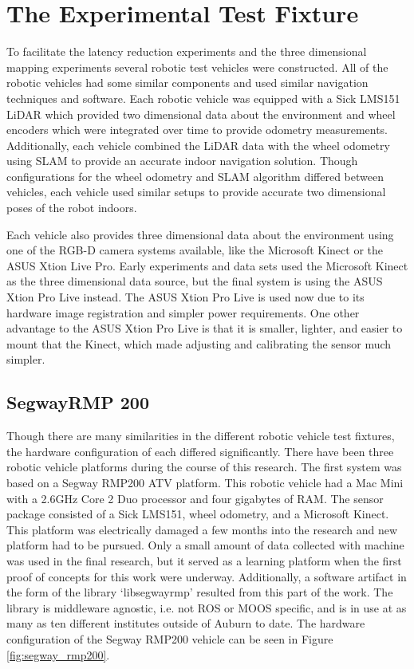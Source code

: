 \documentclass[12pt]{report}
\begin{document}
\section{The Experimental Test Fixture}\label{sec:robotic_vehicle}
To facilitate the latency reduction experiments and the three dimensional mapping experiments several robotic test vehicles were constructed.  All of the robotic vehicles had some similar components and used similar navigation techniques and software.  Each robotic vehicle was equipped with a Sick LMS151 LiDAR which provided two dimensional data about the environment and wheel encoders which were integrated over time to provide odometry measurements.  Additionally, each vehicle combined the LiDAR data with the wheel odometry using SLAM to provide an accurate indoor navigation solution.  Though configurations for the wheel odometry and SLAM algorithm differed between vehicles, each vehicle used similar setups to provide accurate two dimensional poses of the robot indoors.

Each vehicle also provides three dimensional data about the environment using one of the RGB-D camera systems available, like the Microsoft Kinect or the ASUS Xtion Live Pro.  Early experiments and data sets used the Microsoft Kinect as the three dimensional data source, but the final system is using the ASUS Xtion Pro Live instead.  The ASUS Xtion Pro Live is used now due to its hardware image registration and simpler power requirements.  One other advantage to the ASUS Xtion Pro Live is that it is smaller, lighter, and easier to mount that the Kinect, which made adjusting and calibrating the sensor much simpler.

\subsection{SegwayRMP 200}
Though there are many similarities in the different robotic vehicle test fixtures, the hardware configuration of each differed significantly.  There have been three robotic vehicle platforms during the course of this research.  The first system was based on a Segway RMP200 ATV platform.  This robotic vehicle had a Mac Mini with a 2.6GHz Core 2 Duo processor and four gigabytes of RAM.  The sensor package consisted of a Sick LMS151, wheel odometry, and a Microsoft Kinect.  This platform was electrically damaged a few months into the research and new platform had to be pursued.  Only a small amount of data collected with machine was used in the final research, but it served as a learning platform when the first proof of concepts for this work were underway.  Additionally, a software artifact in the form of the library `libsegwayrmp' resulted from this part of the work.  The library is middleware agnostic, i.e. not ROS or MOOS specific, and is in use at as many as ten different institutes outside of Auburn to date.  The hardware configuration of the Segway RMP200 vehicle can be seen in Figure \ref{fig:segway_rmp200}.
\end{document}

